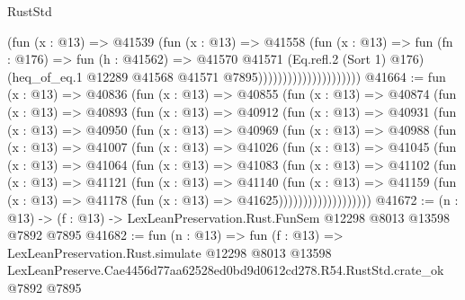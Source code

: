 \begin{lexlean}{RustStd}
\begin{coremodule}
                                      (fun (x : @13) =>
                                      @41539
                                        (fun (x : @13) =>
                                        @41558
                                          (fun (x : @13) =>
                                          fun (fn : @176) =>
                                          fun (h : @41562) =>
                                          @41570
                                            @41571
                                            (Eq.refl.{2} (Sort 1) @176)
                                            (heq_of_eq.{1}
                                              @12289
                                              @41568
                                              @41571
                                              @7895)))))))))))))))))))))
@41664 := fun (x : @13) =>
  @40836
    (fun (x : @13) =>
    @40855
      (fun (x : @13) =>
      @40874
        (fun (x : @13) =>
        @40893
          (fun (x : @13) =>
          @40912
            (fun (x : @13) =>
            @40931
              (fun (x : @13) =>
              @40950
                (fun (x : @13) =>
                @40969
                  (fun (x : @13) =>
                  @40988
                    (fun (x : @13) =>
                    @41007
                      (fun (x : @13) =>
                      @41026
                        (fun (x : @13) =>
                        @41045
                          (fun (x : @13) =>
                          @41064
                            (fun (x : @13) =>
                            @41083
                              (fun (x : @13) =>
                              @41102
                                (fun (x : @13) =>
                                @41121
                                  (fun (x : @13) =>
                                  @41140
                                    (fun (x : @13) =>
                                    @41159
                                      (fun (x : @13) =>
                                      @41178 (fun (x : @13) => @41625)))))))))))))))))))
@41672 := (n : @13) -> (f : @13) -> LexLeanPreservation.Rust.FunSem @12298 @8013 @13598 @7892 @7895
@41682 := fun (n : @13) =>
  fun (f : @13) =>
  LexLeanPreservation.Rust.simulate
    @12298
    @8013
    @13598
    LexLeanPreserve.Cae4456d77aa62528ed0bd9d0612cd278.R54.RustStd.crate_ok
    @7892
    @7895
\end{coremodule}
\end{lexlean}
